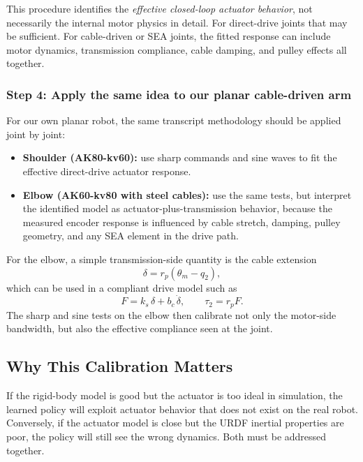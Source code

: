 \documentclass[11pt,a4paper]{article}
\begin{document}
\begin{warnbox}
This procedure identifies the \emph{effective closed-loop actuator behavior},
not necessarily the internal motor physics in detail.  For direct-drive joints
that may be sufficient.  For cable-driven or SEA joints, the fitted response
can include motor dynamics, transmission compliance, cable damping, and pulley
effects all together.
\end{warnbox}

\subsubsection{Step 4: Apply the same idea to our planar cable-driven arm}

For our own planar robot, the same transcript methodology should be applied
joint by joint:
\begin{itemize}[leftmargin=2em]
      \item \textbf{Shoulder (AK80-kv60):} use sharp commands and sine waves to fit
                        the effective direct-drive actuator response.
      \item \textbf{Elbow (AK60-kv80 with steel cables):} use the same tests, but
                        interpret the identified model as actuator-plus-transmission behavior,
                        because the measured encoder response is influenced by cable stretch,
                        damping, pulley geometry, and any SEA element in the drive path.
\end{itemize}

For the elbow, a simple transmission-side quantity is the cable extension
\begin{equation}
      \delta = r_p(\theta_m - q_2),
      \label{eq:elbow_delta_methodology}
\end{equation}
which can be used in a compliant drive model such as
\begin{equation}
      F = k_s\,\delta + b_c\,\dot{\delta},
      \qquad
      \tau_2 = r_p F.
      \label{eq:elbow_force_methodology}
\end{equation}
The sharp and sine tests on the elbow then calibrate not only the motor-side
bandwidth, but also the effective compliance seen at the joint.

\subsection{Why This Calibration Matters}

If the rigid-body model is good but the actuator is too ideal in simulation,
the learned policy will exploit actuator behavior that does not exist on the
real robot.  Conversely, if the actuator model is close but the URDF inertial
properties are poor, the policy will still see the wrong dynamics.  Both must
be addressed together.
\end{document}
